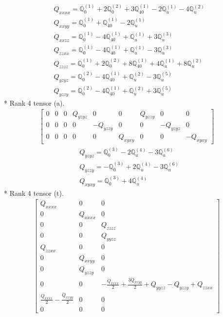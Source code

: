 \documentclass[fleqn,8pt,landscape]{jsarticle}
\begin{document}
\begin{align*}
& Q_{xxxx} = \mathbb{Q}_{0}^{(1)} + 2 \mathbb{Q}_{0}^{(2)} + 3 \mathbb{Q}_{40}^{(1)} - 2 \mathbb{Q}_{u}^{(1)} - 4 \mathbb{Q}_{u}^{(2)} \\
& Q_{xxyy} = \mathbb{Q}_{0}^{(1)} + \mathbb{Q}_{40}^{(1)} - 2 \mathbb{Q}_{u}^{(1)} \\
& Q_{xxzz} = \mathbb{Q}_{0}^{(1)} - 4 \mathbb{Q}_{40}^{(1)} + \mathbb{Q}_{u}^{(1)} + 3 \mathbb{Q}_{u}^{(3)} \\
& Q_{zzxx} = \mathbb{Q}_{0}^{(1)} - 4 \mathbb{Q}_{40}^{(1)} + \mathbb{Q}_{u}^{(1)} - 3 \mathbb{Q}_{u}^{(3)} \\
& Q_{zzzz} = \mathbb{Q}_{0}^{(1)} + 2 \mathbb{Q}_{0}^{(2)} + 8 \mathbb{Q}_{40}^{(1)} + 4 \mathbb{Q}_{u}^{(1)} + 8 \mathbb{Q}_{u}^{(2)} \\
& Q_{yzyz} = \mathbb{Q}_{0}^{(2)} - 4 \mathbb{Q}_{40}^{(1)} + \mathbb{Q}_{u}^{(2)} - 3 \mathbb{Q}_{u}^{(5)} \\
& Q_{yzzy} = \mathbb{Q}_{0}^{(2)} - 4 \mathbb{Q}_{40}^{(1)} + \mathbb{Q}_{u}^{(2)} + 3 \mathbb{Q}_{u}^{(5)}
\end{align*}
* Rank 4 tensor (a).
\begin{align*}
\begin{bmatrix} 0 & 0 & 0 & Q_{yzyz} & 0 & 0 & Q_{yzzy} & 0 & 0 \\ 0 & 0 & 0 & 0 & - Q_{yzzy} & 0 & 0 & - Q_{yzyz} & 0 \\ 0 & 0 & 0 & 0 & 0 & Q_{xyxy} & 0 & 0 & - Q_{xyxy} \end{bmatrix}
\end{align*}
\begin{align*}
& Q_{yzyz} = \mathbb{Q}_{0}^{(3)} - 2 \mathbb{Q}_{u}^{(4)} - 3 \mathbb{Q}_{u}^{(6)} \\
& Q_{yzzy} = - \mathbb{Q}_{0}^{(3)} + 2 \mathbb{Q}_{u}^{(4)} - 3 \mathbb{Q}_{u}^{(6)} \\
& Q_{xyxy} = \mathbb{Q}_{0}^{(3)} + 4 \mathbb{Q}_{u}^{(4)}
\end{align*}
* Rank 4 tensor (t).
\begin{align*}
\begin{bmatrix} Q_{xxxx} & 0 & 0 \\ 0 & Q_{xxxx} & 0 \\ 0 & 0 & Q_{zzzz} \\ 0 & 0 & Q_{yyzz} \\ Q_{zzxx} & 0 & 0 \\ 0 & Q_{xxyy} & 0 \\ 0 & Q_{yzzy} & 0 \\ 0 & 0 & - \frac{Q_{xxxx}}{2} + \frac{3 Q_{xxyy}}{2} + Q_{yyzz} - Q_{yzzy} + Q_{zzxx} \\ \frac{Q_{xxxx}}{2} - \frac{Q_{xxyy}}{2} & 0 & 0 \\ 0 & 0 & 0 \end{bmatrix}
\end{align*}
\end{document}

